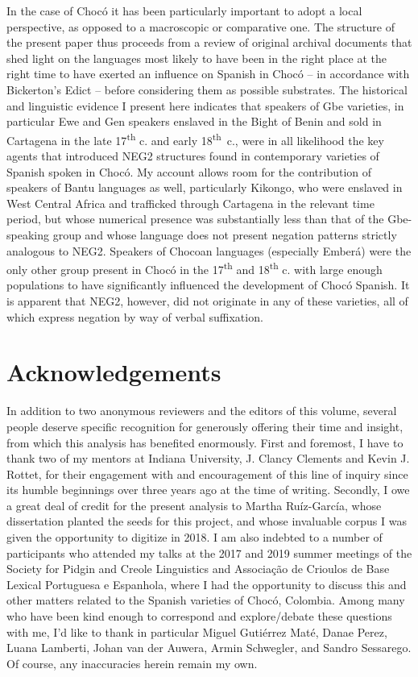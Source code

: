 \documentclass[output=paper,colorlinks,citecolor=brown]{langscibook}
\begin{document}
In the case of Chocó it has been particularly important to adopt a local perspective, as opposed to a macroscopic or comparative one. The structure of the present paper thus proceeds from a review of original archival documents that shed light on the languages most likely to have been in the right place at the right time to have exerted an influence on Spanish in Chocó – in accordance with Bickerton’s Edict – before considering them as possible substrates. The historical and linguistic evidence I present here indicates that speakers of Gbe varieties, in particular Ewe and Gen speakers enslaved in the Bight of Benin and sold in Cartagena in the late 17\textsuperscript{th} c. and early 18\textsuperscript{th}~c., were in all likelihood the key agents that introduced NEG2 structures found in contemporary varieties of Spanish spoken in Chocó. My account allows room for the contribution of speakers of Bantu languages as well, particularly Kikongo, who were enslaved in West Central Africa and trafficked through Cartagena in the relevant time period, but whose numerical presence was substantially less than that of the Gbe-speaking group and whose language does not present negation patterns strictly analogous to NEG2. Speakers of Chocoan languages (especially Emberá) were the only other group present in Chocó in the 17\textsuperscript{th} and 18\textsuperscript{th} c. with large enough populations to have significantly influenced the development of Chocó Spanish. It is apparent that NEG2, however, did not originate in any of these varieties, all of which express negation by way of verbal suffixation.  


\section*{Acknowledgements}
In addition to two anonymous reviewers and the editors of this volume, several people deserve specific recognition for generously offering their time and insight, from which this analysis has benefited enormously. First and foremost, I have to thank two of my mentors at Indiana University, J. Clancy Clements and Kevin J. Rottet, for their engagement with and encouragement of this line of inquiry since its humble beginnings over three years ago at the time of writing. Secondly, I owe a great deal of credit for the present analysis to Martha Ruíz-García, whose dissertation planted the seeds for this project, and whose invaluable corpus I was given the opportunity to digitize in 2018. I am also indebted to a number of participants who attended my talks at the 2017 and 2019 summer meetings of the Society for Pidgin and Creole Linguistics and Associação de Crioulos de Base Lexical Portuguesa e Espanhola, where I had the opportunity to discuss this and other matters related to the Spanish varieties of Chocó, Colombia. Among many who have been kind enough to correspond and explore\slash debate these questions with me, I’d like to thank in particular Miguel Gutiérrez Maté, Danae Perez, Luana Lamberti, Johan van der Auwera, Armin Schwegler, and Sandro Sessarego. Of course, any inaccuracies herein remain my own.

\printbibliography[heading=subbibliography,notkeyword=this]
\end{document}
